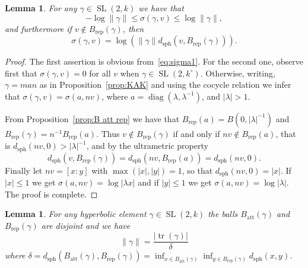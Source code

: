 \documentclass[10pt]{amsart}
\newtheorem{lemm}[theo]{Lemma}\newtheorem{prop}[theo]{Proposition}\newtheorem{coro}[theo]{Corollary}\newtheorem{conj}[theo]{Conjecture}
\theoremstyle{definition}\newtheorem{defi}[theo]{Definition}\newtheorem{rema}[theo]{Remark}\newtheorem{exam}[theo]{Example}\newtheorem{exem}[theo]{Example}\newtheorem{nota}[theo]{Notation}
\DeclareMathOperator{\tr}{tr}
\DeclareMathOperator{\sph}{sph}
\DeclareMathOperator{\SL}{SL}
\DeclareMathOperator{\diag}{diag}
\newcommand{\abs}[1]{\left\vert#1\right\vert}
\newcommand{\lrpar}[1]{\left(#1\right)}
\newcommand{\la}{\lambda}
\newcommand{\att}{\mathrm{att}}
\newcommand{\rep}{\mathrm{rep}}
\newcommand{\inv}{^{-1}}
\begin{document}
\begin{lemm}\label{lem:expand vector 1}
For any $\gamma\in \SL(2,k)$ we have that
\[
- \log \|\gamma\| \le \sigma(\gamma,v) \le \log\|\gamma\|,
\]
and furthermore if $v\notin B_\rep(\gamma)$, then
\[
\sigma(\gamma,v) = \log\lrpar{\|\gamma\| d_{\mathrm{sph}}(v,B_\rep(\gamma))}.
\]
\end{lemm}

\begin{proof}
The first assertion is obvious from~\eqref{eq:sigma1}. For the second one, observe first that $\sigma(\gamma,v) = 0$ for all $v$ when $\gamma\in \SL(2,k^\circ)$. Otherwise, writing, $ \gamma = m a n$ as in Proposition~\ref{prop:KAK} and using the cocycle relation we infer that $\sigma(\gamma, v) = \sigma(a, nv)$, where $a = \diag(\lambda, \lambda^{-1})$, and $\abs{\lambda}>1$.

From Proposition~\ref{prop:B att rep} we have that $B_{\rep}(a) = B(0, \abs{\la}^{-1})$ and $B_{\rep}(\gamma) = n^{-1}B_{\rep}(a)$. Thus $v\notin B_{\rep}(\gamma)$ if and only if $nv\notin B_{\rep}(a)$, that is $d_{\mathrm{sph}}(nv, 0) > \abs{\lambda}\inv$, and by the ultrametric property
\[
d_{\mathrm{sph}}(v, B_{\rep}(\gamma)) =d_{\mathrm{sph}}(nv, B_{\rep}(a))= d_{\mathrm{sph}}(nv, 0).
\]
Finally let $nv = [x:y]$ with $\max(\abs{x}, \abs{y}) = 1$, so that $d_{\mathrm{sph}}(nv, 0) = \abs{x}$. If $\abs{x}\leq 1$ we get $\sigma(a,nv) = \log \abs{\lambda x} $ and if $\abs{y}\leq 1$ we get $\sigma(a,nv) = \log \abs{\lambda}$. The proof is complete.
\end{proof}

\begin{lemm}\label{lem:expand vector 2}
For any \emph{hyperbolic} element $\gamma\in \SL(2,k)$ the balls $B_\att(\gamma)$ and $B_\rep(\gamma)$ are disjoint and we have
\begin{equation}\label{eq:expand}
\|\gamma\| = \frac{\mathopen|\tr(\gamma)\mathclose|}{\delta}
\end{equation}
where $\delta = d_{\sph} (B_\att(\gamma), B_\rep(\gamma)) =\inf_{x\in B_\att(\gamma)} \inf_{y\in B_\rep(\gamma)} d_{\sph}(x,y)$.
\end{lemm}
\end{document}
